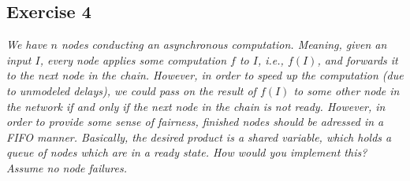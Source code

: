 \subsection*{Exercise 4}
\label{sec:exercise_5}

\emph{We have $n$ nodes conducting an asynchronous computation. Meaning, given an input $I$, every node applies some computation $f$ to $I$, i.e., $f(I)$, and forwards it to the next node in the chain. However, in order to speed up the computation (due to unmodeled delays), we could pass on the result of $f(I)$ to some other node in the network if and only if the next node in the chain is not ready. However, in order to provide some sense of fairness, finished nodes should be adressed in a FIFO manner. Basically, the desired product is a shared variable, which holds a queue of nodes which are in a ready state. How would you implement this? Assume no node failures.}


